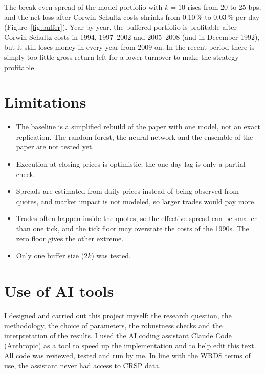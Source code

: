 \documentclass[11pt,a4paper]{article}
\theoremstyle{definition}
\theoremstyle{remark}
\begin{document}
The break-even spread of the model portfolio with $k = 10$ rises from 20 to
25 bps, and the net loss after Corwin-Schultz costs shrinks from 0.10\,\% to
0.03\,\% per day (Figure~\ref{fig:buffer}). Year by year, the buffered
portfolio is profitable after Corwin-Schultz costs in 1994, 1997--2002 and
2005--2008 (and in December 1992), but it still loses money in every year from
2009 on. In the recent period there is simply too little gross return left for
a lower turnover to make the strategy profitable.


\section{Limitations}

\begin{itemize}
  \item The baseline is a simplified rebuild of the paper with one model, not an
        exact replication. The random forest, the neural network and the
        ensemble of the paper are not tested yet.
  \item Execution at closing prices is optimistic; the one-day lag is only a
        partial check.
  \item Spreads are estimated from daily prices instead of being observed from
        quotes, and market impact is not modeled, so larger trades would pay more.
  \item Trades often happen inside the quotes, so the effective spread can be
        smaller than one tick, and the tick floor may overstate the costs of
        the 1990s. The zero floor gives the other extreme.
  \item Only one buffer size ($2k$) was tested.
\end{itemize}

\section*{Use of AI tools}

I designed and carried out this project myself: the research question, the
methodology, the choice of parameters, the robustness checks and the
interpretation of the results. I used the AI coding assistant Claude Code
(Anthropic) as a tool to speed up the implementation and to help edit this
text. All code was reviewed, tested and run by me. In line with the WRDS terms
of use, the assistant never had access to CRSP data.



\end{document}
